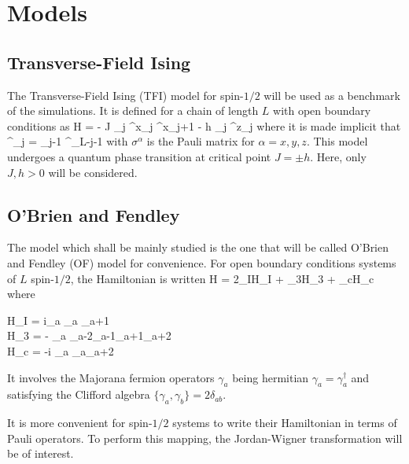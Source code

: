 \section{Models}	

	\subsection{Transverse-Field Ising}	

		The Transverse-Field Ising (TFI) model for spin-$1/2$ will be used as a benchmark of the simulations. It is defined for a chain of length $L$ with open boundary conditions as
		\be \mc H = - J \sum_j \sigma^x_j \sigma^x_{j+1} - h \sum_j \sigma^z_j \label{eq:TFI} \ee
		where it is made implicit that 
		\be \sigma^\alpha_j = \underbrace{\one \otimes \cdots \otimes \one}_{j-1} \otimes \sigma^\alpha \otimes \underbrace{\one \otimes \cdots \otimes \one}_{L-j-1} \ee
		with $\sigma^\alpha$ is the Pauli matrix for $\alpha=x,y,z$. This model undergoes a quantum phase transition at critical point $J=\pm h$. Here, only $J, h > 0$ will be considered.

	\subsection{O'Brien and Fendley}

		The model which shall be mainly studied is the one that will be called O'Brien and Fendley \cite{obrien2018} (OF) model for convenience. For open boundary conditions systems of $L$ spin-$1/2$, the Hamiltonian is written
		\be \mc H = 2\lambda_I\mc H_I + \lambda_3\mc H_3 + \lambda_c\mc H_c \ee
		where
		\be \begin{cases} \mc H_I = i\sum_a \gamma_a \gamma_{a+1} \\ \mc H_3 = - \sum_a \gamma_{a-2}\gamma_{a-1}\gamma_{a+1}\gamma_{a+2} \\ \mc H_c = -i \sum_a \gamma_a\gamma_{a+2} \end{cases} \ee
		It involves the Majorana fermion operators $\gamma_a$ being hermitian $\gamma_a = \gamma_a^\dagger$ and satisfying the Clifford algebra $\{\gamma_a, \gamma_b\} = 2\delta_{ab}$.

		It is more convenient for spin-$1/2$ systems to write their Hamiltonian in terms of Pauli operators. To perform this mapping, the Jordan-Wigner transformation will be of interest.

